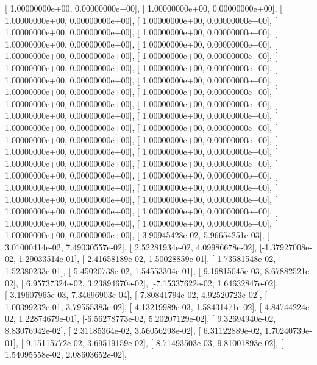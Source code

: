 \documentclass{article}
\begin{document}
       [ 1.00000000e+00,  0.00000000e+00],
       [ 1.00000000e+00,  0.00000000e+00],
       [ 1.00000000e+00,  0.00000000e+00],
       [ 1.00000000e+00,  0.00000000e+00],
       [ 1.00000000e+00,  0.00000000e+00],
       [ 1.00000000e+00,  0.00000000e+00],
       [ 1.00000000e+00,  0.00000000e+00],
       [ 1.00000000e+00,  0.00000000e+00],
       [ 1.00000000e+00,  0.00000000e+00],
       [ 1.00000000e+00,  0.00000000e+00],
       [ 1.00000000e+00,  0.00000000e+00],
       [ 1.00000000e+00,  0.00000000e+00],
       [ 1.00000000e+00,  0.00000000e+00],
       [ 1.00000000e+00,  0.00000000e+00],
       [ 1.00000000e+00,  0.00000000e+00],
       [ 1.00000000e+00,  0.00000000e+00],
       [ 1.00000000e+00,  0.00000000e+00],
       [ 1.00000000e+00,  0.00000000e+00],
       [ 1.00000000e+00,  0.00000000e+00],
       [ 1.00000000e+00,  0.00000000e+00],
       [ 1.00000000e+00,  0.00000000e+00],
       [ 1.00000000e+00,  0.00000000e+00],
       [ 1.00000000e+00,  0.00000000e+00],
       [ 1.00000000e+00,  0.00000000e+00],
       [ 1.00000000e+00,  0.00000000e+00],
       [ 1.00000000e+00,  0.00000000e+00],
       [ 1.00000000e+00,  0.00000000e+00],
       [ 1.00000000e+00,  0.00000000e+00],
       [ 1.00000000e+00,  0.00000000e+00],
       [ 1.00000000e+00,  0.00000000e+00],
       [ 1.00000000e+00,  0.00000000e+00],
       [ 1.00000000e+00,  0.00000000e+00],
       [ 1.00000000e+00,  0.00000000e+00],
       [ 1.00000000e+00,  0.00000000e+00],
       [ 1.00000000e+00,  0.00000000e+00],
       [ 1.00000000e+00,  0.00000000e+00],
       [ 1.00000000e+00,  0.00000000e+00],
       [ 1.00000000e+00,  0.00000000e+00],
       [ 1.00000000e+00,  0.00000000e+00],
       [-3.90945428e-02,  5.96654251e-03],
       [ 3.01000414e-02,  7.49030557e-02],
       [ 2.52281934e-02,  4.09986678e-02],
       [-1.37927008e-02,  1.29033514e-01],
       [-2.41658189e-02,  1.50028859e-01],
       [ 1.73581548e-02,  1.52380233e-01],
       [ 5.45020738e-02,  1.54553304e-01],
       [ 9.19815045e-03,  8.67882521e-02],
       [ 6.95737324e-02,  3.23894670e-02],
       [-7.15337622e-02,  1.64632847e-02],
       [-3.19607965e-03,  7.34696903e-04],
       [-7.80841794e-02,  4.92520723e-02],
       [ 1.00399232e-01,  3.79555383e-02],
       [ 4.13219989e-03,  1.58431471e-02],
       [-4.84744224e-02,  1.22874679e-01],
       [-6.56278773e-02,  5.20207129e-02],
       [ 9.32694940e-02,  8.83076942e-02],
       [ 2.31185364e-02,  3.56056298e-02],
       [ 6.31122889e-02,  1.70240739e-01],
       [-9.15115772e-02,  3.69519159e-02],
       [-8.71493503e-03,  9.81001893e-02],
       [ 1.54095558e-02,  2.08603652e-02],
\end{document}
